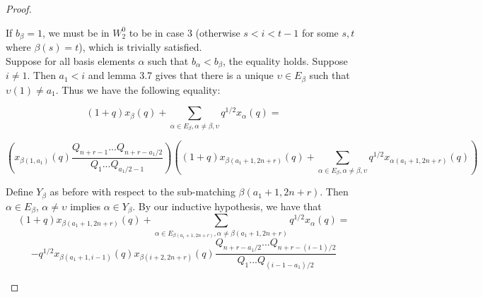 \documentclass{amsart}
\begin{document}
\begin{proof}
\begin{enumerate}
	If $b_\beta=1$, we must be in $W_2^0$ to be in case 3 (otherwise $s<i<t-1$ for some $s,t$ where $\beta(s)=t$), which is trivially satisfied. 
	\\
	
%	
%	
%	
%	
	
	Suppose for all basis elements $\alpha$ such that $b_\alpha<b_\beta$, the equality holds. Suppose $i\not=1$. Then $a_1<i$ and lemma 3.7 gives that there is a unique $\upsilon\in E_\beta$ such that $\upsilon(1)\not=a_1$. Thus we have the following equality:
	
	$$(1+q)x_\beta(q)+\sum_{\alpha\in E_\beta,\alpha\not=\beta,\upsilon}q^{1/2}x_\alpha(q)=$$
	
	$$(x_{\beta(1,a_1)}(q)\frac{Q_{n+r-1}...Q_{n+r-a_1/2}}{Q_1...Q_{a_1/2-1}})((1+q)x_{\beta(a_1+1,2n+r)}(q)+\sum_{\alpha\in E_\beta,\alpha\not=\beta,\upsilon}q^{1/2}x_{\alpha(a_1+1,2n+r)}(q))$$
	
	Define $Y_\beta$ as before with respect to the sub-matching $\beta(a_1+1,2n+r)$. Then $\alpha\in E_\beta$, $\alpha\not=\upsilon$ implies $\alpha\in Y_\beta$. By our inductive hypothesis, we have that 
	$$(1+q)x_{\beta(a_1+1,2n+r)}(q)+\sum_{\alpha\in E_{\beta(a_1+1,2n+r)},\alpha\not=\beta(a_1+1,2n+r)}q^{1/2}x_{\alpha}(q)=$$
	$$
	-q^{1/2}x_{\beta(a_1+1,i-1)}(q)x_{\beta(i+2,2n+r)}(q)\frac{Q_{n+r-a_1/2}...Q_{n+r-(i-1)/2}}{Q_1...Q_{(i-1-a_1)/2}}$$
	

\end{enumerate}
\end{proof}
\end{document}
